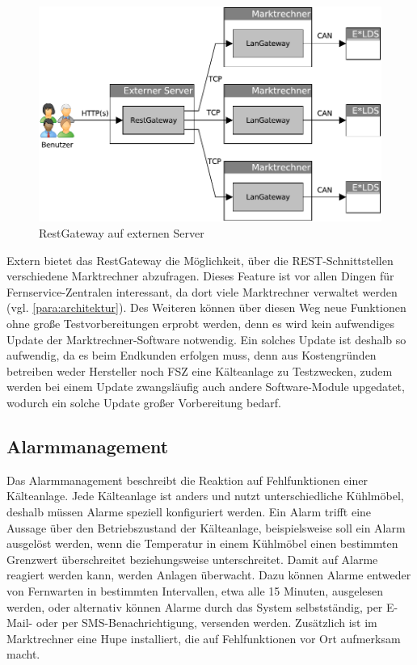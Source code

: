 \documentclass[11pt,a4paper]{report}
\begin{document}
\begin{figure}[htbp]
\centering
\includegraphics[scale=0.7]{images/RestGateway_extern.pdf}
\caption[]{RestGateway auf externen Server}
\label{fig:rest_extern}
\end{figure}

Extern bietet das RestGateway die Möglichkeit, über die REST-Schnittstellen verschiedene Marktrechner abzufragen. Dieses Feature ist vor allen Dingen für Fernservice-Zentralen interessant, da dort viele Marktrechner verwaltet werden (vgl. \ref{para:architektur}). Des Weiteren können über diesen Weg neue Funktionen ohne große Testvorbereitungen erprobt werden, denn es wird kein aufwendiges Update der Marktrechner-Software notwendig. Ein solches Update ist deshalb so aufwendig, da es beim Endkunden erfolgen muss, denn aus Kostengründen betreiben weder Hersteller noch FSZ eine Kälteanlage zu Testzwecken, zudem werden bei einem Update zwangsläufig auch andere Software-Module upgedatet, wodurch ein solche Update großer Vorbereitung bedarf.

\subsection{Alarmmanagement} 

Das Alarmmanagement beschreibt die Reaktion auf Fehlfunktionen einer Kälteanlage. Jede Kälteanlage ist anders und nutzt unterschiedliche Kühlmöbel, deshalb müssen Alarme speziell konfiguriert werden. Ein Alarm trifft eine Aussage über den Betriebszustand der Kälteanlage, beispielsweise soll ein Alarm ausgelöst werden, wenn die Temperatur in einem Kühlmöbel einen bestimmten Grenzwert überschreitet beziehungsweise unterschreitet. Damit auf Alarme reagiert werden kann, werden Anlagen überwacht. Dazu können Alarme entweder von Fernwarten in bestimmten Intervallen, etwa alle 15 Minuten, ausgelesen werden, oder alternativ können Alarme durch das System selbstständig, per E-Mail- oder per SMS-Benachrichtigung, versenden werden. Zusätzlich ist im Marktrechner eine Hupe installiert, die auf Fehlfunktionen vor Ort aufmerksam macht. 
\end{document}
